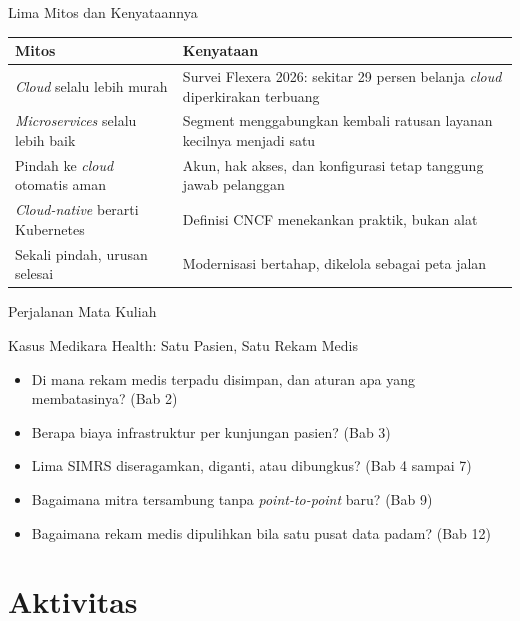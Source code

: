 \documentclass[aspectratio=169, table, 12pt]{beamer}
\begin{document}
\begin{frame}{Lima Mitos dan Kenyataannya}
  \footnotesize
  \begin{tabularx}{\textwidth}{>{\raggedright\arraybackslash}p{4.2cm}
                               >{\raggedright\arraybackslash}X}
    \hline
    \textbf{Mitos} & \textbf{Kenyataan} \\
    \hline
    \textit{Cloud} selalu lebih murah & Survei Flexera 2026: sekitar 29 persen belanja
      \textit{cloud} diperkirakan terbuang \\
    \hline
    \textit{Microservices} selalu lebih baik & Segment menggabungkan kembali ratusan
      layanan kecilnya menjadi satu \\
    \hline
    Pindah ke \textit{cloud} otomatis aman & Akun, hak akses, dan konfigurasi tetap
      tanggung jawab pelanggan \\
    \hline
    \textit{Cloud-native} berarti Kubernetes & Definisi CNCF menekankan praktik, bukan
      alat \\
    \hline
    Sekali pindah, urusan selesai & Modernisasi bertahap, dikelola sebagai peta jalan \\
    \hline
  \end{tabularx}
\end{frame}

\begin{frame}{Perjalanan Mata Kuliah}
  \centering
  \resizebox{0.95\textwidth}{!}{}
\end{frame}

\begin{frame}{Kasus Medikara Health: Satu Pasien, Satu Rekam Medis}
  \begin{itemize}
    \item Di mana rekam medis terpadu disimpan, dan aturan apa yang membatasinya?
          (Bab 2)
    \item Berapa biaya infrastruktur per kunjungan pasien? (Bab 3)
    \item Lima SIMRS diseragamkan, diganti, atau dibungkus? (Bab 4 sampai 7)
    \item Bagaimana mitra tersambung tanpa \textit{point-to-point} baru? (Bab 9)
    \item Bagaimana rekam medis dipulihkan bila satu pusat data padam? (Bab 12)
  \end{itemize}
\end{frame}

\section{Aktivitas}
\end{document}
